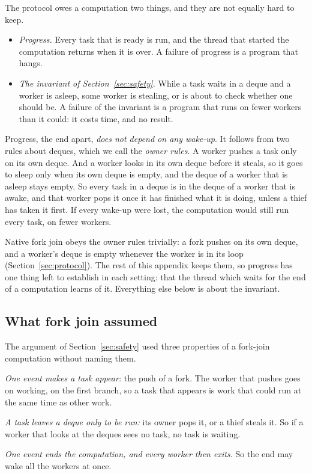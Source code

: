 \documentclass[sigplan,nonacm]{acmart}
\begin{document}
The protocol owes a computation two things, and they are not equally
hard to keep.

\begin{itemize}[leftmargin=*]
\item \emph{Progress.}
  Every task that is ready is run, and the thread that started the
  computation returns when it is over.
  A failure of progress is a program that hangs.
\item \emph{The invariant of Section~\ref{sec:safety}.}
  While a task waits in a deque and a worker is asleep, some worker is
  stealing, or is about to check whether one should be.
  A failure of the invariant is a program that runs on fewer workers
  than it could: it costs time, and no result.
\end{itemize}

Progress, the end apart, \emph{does not depend on any wake-up}.
%
It follows from two rules about deques, which we call the
\emph{owner rules}.
%
A worker pushes a task only on its own deque.
%
And a worker looks in its own deque before it steals, so it goes to
sleep only when its own deque is empty, and the deque of a worker
that is asleep stays empty.
%
So every task in a deque is in the deque of a worker that is awake,
and that worker pops it once it has finished what it is doing, unless
a thief has taken it first.
%
If every wake-up were lost, the computation would still run every
task, on fewer workers.

Native fork join obeys the owner rules trivially: a fork pushes on its
own deque, and a worker's deque is empty whenever the worker is in its
loop (Section~\ref{sec:protocol}).
%
The rest of this appendix keeps them, so progress has one thing left
to establish in each setting: that the thread which waits for the end
of a computation learns of it.
%
Everything else below is about the invariant.

\subsection{What fork join assumed}

The argument of Section~\ref{sec:safety} used three properties of a
fork-join computation without naming them.

\begin{description}[leftmargin=1.5em]
\item[F1] \emph{One event makes a task appear:} the push of a fork.
  The worker that pushes goes on working, on the first branch, so a
  task that appears is work that could run at the same time as other
  work.
\item[F2] \emph{A task leaves a deque only to be run:} its owner pops
  it, or a thief steals it.
  So if a worker that looks at the deques sees no task, no task is
  waiting.
\item[F3] \emph{One event ends the computation, and every worker then
  exits.}
  So the end may wake all the workers at once.
\end{description}
\end{document}
